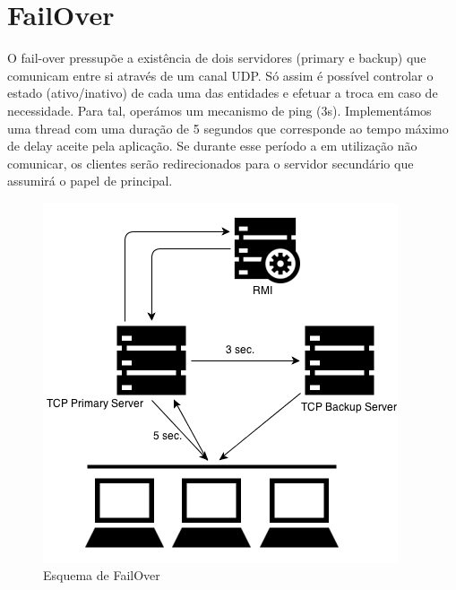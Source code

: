\documentclass[12pt]{article} %
\begin{document}
\pagebreak

\section{FailOver}
\label{sec:failover}
O fail-over pressupõe a existência de dois servidores (primary e backup) que comunicam entre si através de um canal UDP. Só assim é possível controlar o estado (ativo/inativo) de cada uma das entidades e efetuar a troca em caso de necessidade. Para tal, operámos um mecanismo de ping (3s).
Implementámos uma thread com uma duração de 5 segundos que corresponde ao tempo máximo de delay aceite pela aplicação. Se durante esse período a  em utilização não comunicar, os clientes serão redirecionados para o servidor secundário que assumirá o papel de principal.

\begin{figure}[!ht]
	\centering
		\includegraphics[scale=0.6]{failover.png}
	\caption{Esquema de FailOver}
	\label{fig:Pictures_failover}
\end{figure}

\pagebreak
\end{document}
